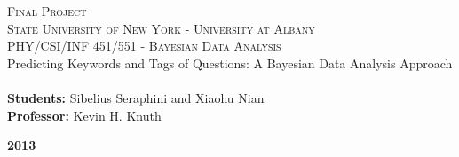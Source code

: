 \begin{titlepage}

\begin{center}

\textsc{\large Final Project}\\[3cm]

\textsc{\large State University of New York - University at Albany}\\[0.5cm]

\textsc{\large PHY/CSI/INF 451/551 - Bayesian Data Analysis}\\[3cm]

\huge Predicting Keywords and Tags of Questions: A Bayesian Data Analysis Approach \\[-0.5cm]
\HRule \\[2cm]

\Large \textbf{Students:} Sibelius Seraphini and Xiaohu Nian \\[0.5cm]

\Large \textbf{Professor:} Kevin H. Knuth 

\vfill

\textbf{2013}

\end{center}

\end{titlepage}
